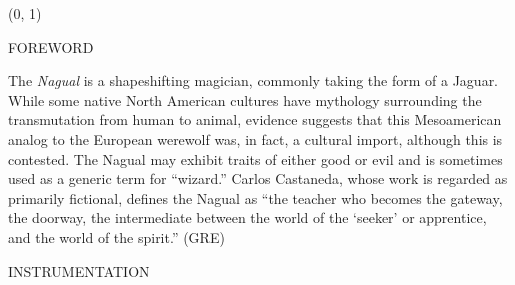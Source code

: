 \documentclass[11pt]{article}
\begin{document}
\begin{textblock}{23}(0, 1)
\begin{center}
\huge FOREWORD
\end{center}
\end{textblock}

\vspace*{0.25\baselineskip}

\begingroup
\begin{center}
The \textit{Nagual} is a shapeshifting magician, commonly taking the form of a Jaguar. While some native North American cultures have mythology surrounding the transmutation from human to animal, evidence suggests that this Mesoamerican analog to the European werewolf was, in fact, a cultural import, although this is contested. The Nagual may exhibit traits of either good or evil and is sometimes used as a generic term for ``wizard.'' Carlos Castaneda, whose work is regarded as primarily fictional, defines the Nagual as ``the teacher who becomes the gateway, the doorway, the intermediate between the world of the `seeker' or apprentice, and the world of the spirit.''
\rightskip\leftskip
\phantom{text} \hfill (GRE)
\end{center}
\endgroup

\begin{center}
\huge INSTRUMENTATION
\end{center}
\end{document}
